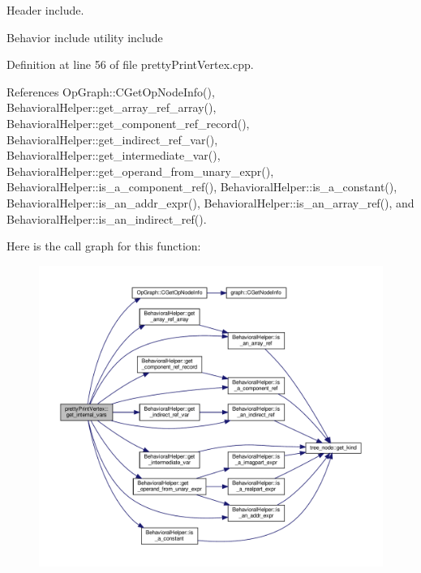 Header include. 

Behavior include utility include 

Definition at line 56 of file pretty\+Print\+Vertex.\+cpp.



References Op\+Graph\+::\+C\+Get\+Op\+Node\+Info(), Behavioral\+Helper\+::get\+\_\+array\+\_\+ref\+\_\+array(), Behavioral\+Helper\+::get\+\_\+component\+\_\+ref\+\_\+record(), Behavioral\+Helper\+::get\+\_\+indirect\+\_\+ref\+\_\+var(), Behavioral\+Helper\+::get\+\_\+intermediate\+\_\+var(), Behavioral\+Helper\+::get\+\_\+operand\+\_\+from\+\_\+unary\+\_\+expr(), Behavioral\+Helper\+::is\+\_\+a\+\_\+component\+\_\+ref(), Behavioral\+Helper\+::is\+\_\+a\+\_\+constant(), Behavioral\+Helper\+::is\+\_\+an\+\_\+addr\+\_\+expr(), Behavioral\+Helper\+::is\+\_\+an\+\_\+array\+\_\+ref(), and Behavioral\+Helper\+::is\+\_\+an\+\_\+indirect\+\_\+ref().

Here is the call graph for this function\+:
\nopagebreak
\begin{figure}[H]
\begin{center}
\leavevmode
\includegraphics[width=350pt]{d1/d0b/structprettyPrintVertex_a0b7c685362aca7a4cd5f0944c5f9e326_cgraph}
\end{center}
\end{figure}
\mbox{\label{structprettyPrintVertex_a4cb8e4223c13af526a915070207d5c6b}} 
